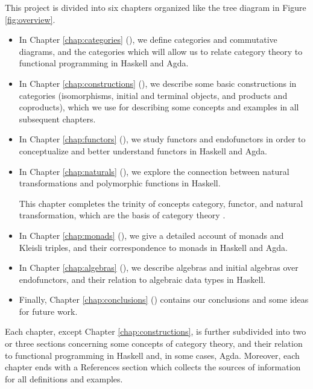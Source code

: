 This project is divided into six chapters organized like the tree
diagram in Figure \ref{fig:overview}.
\begin{itemize}
\item
  In Chapter \ref{chap:categories} (), we
  define categories and commutative diagrams, and the categories which
  will allow us to relate category theory to functional programming in
  Haskell and Agda.

\item
  In Chapter \ref{chap:constructions} (),
  we describe some basic constructions in categories (isomorphisms,
  initial and terminal objects, and products and coproducts), which we
  use for describing some concepts and examples in all subsequent
  chapters.

\item
  In Chapter \ref{chap:functors} (), we study
  functors and endofunctors in order to conceptualize and better
  understand functors in Haskell and Agda.

\item
  In Chapter \ref{chap:naturals} (), we explore
  the connection between natural transformations and polymorphic
  functions in Haskell.

  This chapter completes the trinity of concepts category, functor,
  and natural transformation, which are the basis of category theory
  \parencite{nlab-category-theory}.

\item
  In Chapter \ref{chap:monads} (), we give a
  detailed account of monads and Kleisli triples, and their
  correspondence to monads in Haskell and Agda.

\item
  In Chapter \ref{chap:algebras} (), we
  describe algebras and initial algebras over endofunctors, and their
  relation to algebraic data types in Haskell.

\item
  Finally, Chapter \ref{chap:conclusions} ()
  contains our conclusions and some ideas for future work.

\end{itemize}

Each chapter, except Chapter \ref{chap:constructions}, is further
subdivided into two or three sections concerning some concepts of
category theory, and their relation to functional programming in
Haskell and, in some cases, Agda. Moreover, each chapter ends with a
References section which collects the sources of information for all
definitions and examples.

